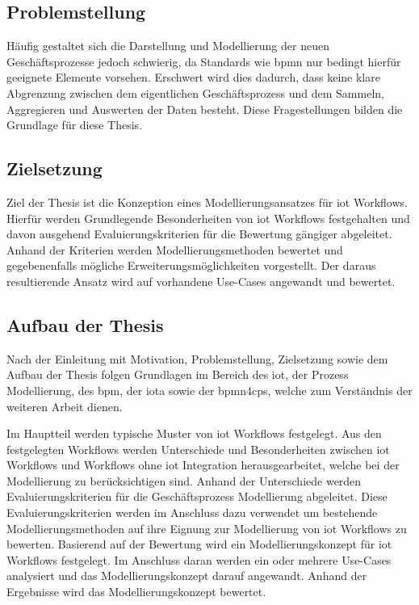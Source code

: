 \documentclass[a4paper, 12pt, twoside, headsepline=true]{scrartcl} %
\begin{document}
\subsection{Problemstellung} 
Häufig gestaltet sich die Darstellung und Modellierung
der neuen Geschäftsprozesse jedoch schwierig, da Standards wie
\ac{bpmn} nur bedingt hierfür geeignete Elemente vorsehen. Erschwert
wird dies dadurch, dass keine klare Abgrenzung zwischen dem
eigentlichen Geschäftsprozess und dem Sammeln, Aggregieren und
Auswerten der Daten besteht. Diese Fragestellungen bilden die
Grundlage für diese Thesis.

\subsection{Zielsetzung}
Ziel der Thesis ist die Konzeption eines Modellierungsansatzes für \ac{iot}
Workflows. Hierfür werden Grundlegende Besonderheiten von \ac{iot} Workflows festgehalten und davon ausgehend Evaluierungskriterien für die Bewertung gängiger abgeleitet. Anhand der Kriterien werden Modellierungsmethoden bewertet und gegebenenfalls mögliche Erweiterungsmöglichkeiten vorgestellt. Der daraus resultierende Ansatz wird auf vorhandene Use-Cases angewandt und bewertet.

\subsection{Aufbau der Thesis}
Nach der Einleitung mit Motivation, Problemstellung, Zielsetzung
 sowie dem Aufbau der Thesis folgen Grundlagen im Bereich des \ac{iot}, der Prozess Modellierung, 
  des \ac{bpm}, der \ac{iota} sowie der \ac{bpmn4cps}, welche zum Verständnis der weiteren Arbeit dienen.
 
 Im Hauptteil werden typische Muster von \ac{iot} Workflows festgelegt. Aus den festgelegten Workflows werden Unterschiede und Besonderheiten zwischen \ac{iot} Workflows und Workflows ohne \ac{iot} Integration herausgearbeitet, welche bei der Modellierung zu berücksichtigen sind.
 Anhand der Unterschiede werden Evaluierungskriterien für die Geschäftsprozess Modellierung abgeleitet. Diese Evaluierungskriterien werden im Anschluss dazu verwendet um bestehende Modellierungsmethoden auf ihre Eignung zur Modellierung von \ac{iot} Workflows zu bewerten. Basierend auf der Bewertung wird ein Modellierungskonzept für \ac{iot} Workflows festgelegt. Im Anschluss daran werden ein oder mehrere Use-Cases analysiert und das Modellierungskonzept darauf angewandt. Anhand der Ergebnisse wird das Modellierungskonzept bewertet.
 
\end{document}
